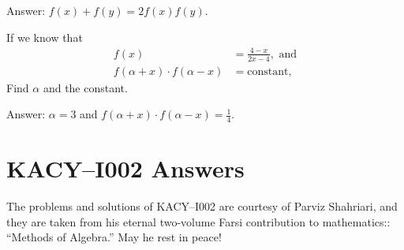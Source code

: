 \documentclass[12pt,a4paper]{memoir}
\theoremstyle{definition}
\begin{document}
\begin{solution}%
	Answer: $f(x)+f(y) = 2f(x)f(y)$.
\end{solution}

\setcounter{question}{113}


\begin{tcolorbox}
	\begin{question}
		If we know that
		\begin{align*}
			f(x) &= \frac{4-x}{2x-4}, \text{ and}\\
			f(\alpha+x) \cdot f(\alpha-x) &= \text{constant},
		\end{align*}
		Find $\alpha$ and the constant.
	\end{question}
\end{tcolorbox}

\begin{solution}%
	Answer: $\alpha=3$ and $f(\alpha+x) \cdot f(\alpha-x) = \frac{1}{4}$.
\end{solution}

\newpage
\section*{KACY--I002 Answers}
%	
The problems and solutions of KACY--I002 are courtesy of Parviz Shahriari, and they are taken from his eternal two-volume Farsi contribution to mathematics:: ``Methods of Algebra.'' May he rest in peace!

\vspace{1em}

	\printsolutions
\end{document}
